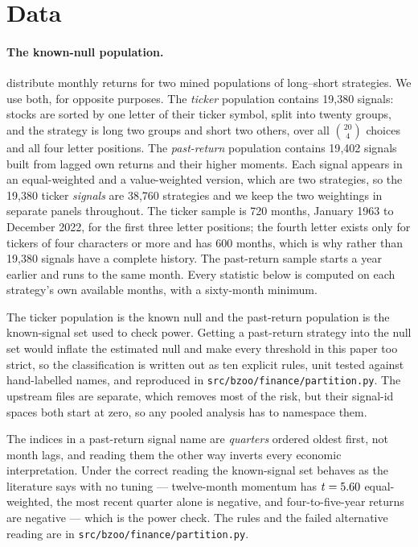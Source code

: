 \documentclass{article}
\begin{document}
\section{Data}
\label{sec:data}

\paragraph{The known-null population.}
\citet{chen2025htap} distribute monthly returns for two mined populations of
long--short strategies. We use both, for opposite purposes. The
\emph{ticker} population contains 19{,}380 signals: stocks are sorted by one
letter of their ticker symbol, split into twenty groups, and the strategy is
long two groups and short two others, over all $\binom{20}{4}$ choices and all
four letter positions. The \emph{past-return} population contains 19{,}402
signals built from lagged own returns and their higher moments. Each signal
appears in an equal-weighted and a value-weighted version, which are two
strategies, so the 19{,}380 ticker \emph{signals} are 38{,}760 strategies and we
keep the two weightings in separate panels throughout. The ticker sample is 720
months, January 1963 to December 2022, for the first three letter positions; the
fourth letter exists only for tickers of four characters or more and has 600
months, which is why \bzoonStrategiesComplete{} rather than 19{,}380 signals
have a complete history. The past-return sample starts a year earlier and runs
to the same month. Every statistic below is computed on each strategy's own
available months, with a sixty-month minimum.

The ticker population is the known null and the past-return population is the
known-signal set used to check power. Getting a past-return strategy into the
null set would inflate the estimated null and make every threshold in this paper
too strict, so the classification is written out as ten explicit rules, unit
tested against hand-labelled names, and reproduced in
\texttt{src/bzoo/finance/partition.py}. The upstream files are separate, which
removes most of the risk, but their signal-id spaces both start at zero, so any
pooled analysis has to namespace them.



The indices in a past-return signal name are \emph{quarters} ordered oldest
first, not month lags, and reading them the other way inverts every economic
interpretation. Under the correct reading the known-signal set behaves as the
literature says with no tuning --- twelve-month momentum has
$t = 5.60{}$ equal-weighted, the most recent quarter alone is
negative, and four-to-five-year returns are negative --- which is the power
check. The rules and the failed alternative reading are in
\texttt{src/bzoo/finance/partition.py}.
\end{document}
